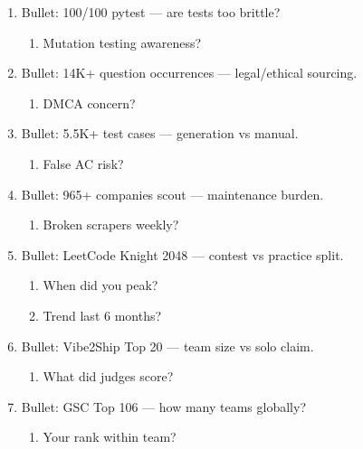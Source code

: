 \documentclass[9pt,a4paper]{article}
\begin{document}
\begin{enumerate}[label=\textbf{Q\arabic*:}, leftmargin=*]
  \begin{enumerate}[label=\textit{FU\arabic*:}, leftmargin=2em]
    \item Naive baseline?
    \item Business acceptable error?
  \end{enumerate}
  \item Bullet: 100/100 pytest --- are tests too brittle?
  \begin{enumerate}[label=\textit{FU\arabic*:}, leftmargin=2em]
    \item Mutation testing awareness?
  \end{enumerate}
  \item Bullet: 14K+ question occurrences --- legal/ethical sourcing.
  \begin{enumerate}[label=\textit{FU\arabic*:}, leftmargin=2em]
    \item DMCA concern?
  \end{enumerate}
  \item Bullet: 5.5K+ test cases --- generation vs manual.
  \begin{enumerate}[label=\textit{FU\arabic*:}, leftmargin=2em]
    \item False AC risk?
  \end{enumerate}
  \item Bullet: 965+ companies scout --- maintenance burden.
  \begin{enumerate}[label=\textit{FU\arabic*:}, leftmargin=2em]
    \item Broken scrapers weekly?
  \end{enumerate}
  \item Bullet: LeetCode Knight 2048 --- contest vs practice split.
  \begin{enumerate}[label=\textit{FU\arabic*:}, leftmargin=2em]
    \item When did you peak?
    \item Trend last 6 months?
  \end{enumerate}
  \item Bullet: Vibe2Ship Top 20 --- team size vs solo claim.
  \begin{enumerate}[label=\textit{FU\arabic*:}, leftmargin=2em]
    \item What did judges score?
  \end{enumerate}
  \item Bullet: GSC Top 106 --- how many teams globally?
  \begin{enumerate}[label=\textit{FU\arabic*:}, leftmargin=2em]
    \item Your rank within team?
  \end{enumerate}
\end{enumerate}
\end{document}
